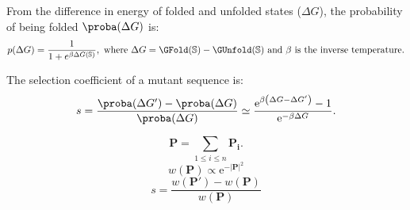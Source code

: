 \documentclass{article}
\newcommand{\e}{\mathrm{e}}
\begin{document}
From the difference in energy of folded and unfolded states ($\Delta G$), the probability of being folded $\proba (\Delta G)$ is:
\begin{equation*}
p(\Delta G) = \dfrac{1}{1 + e^{\beta \Delta G(\mathbb{S}) }}, \text{ where }
\Delta G = \GFold (\mathbb{S}) - \GUnfold (\mathbb{S}) \text{ and $\beta$ is the inverse temperature}.
\end{equation*}

The selection coefficient of a mutant sequence is:
\begin{equation*}
s  = \dfrac{\proba (\Delta G') - \proba (\Delta G)}{\proba (\Delta G)} \simeq \dfrac{ \e^{\beta \left( \Delta G - \Delta G' \right) } - 1}{ \e^{- \beta \Delta G }}.
\end{equation*}

\begin{center}
\end{center}
\begin{equation*}
\bm{P}  = \sum\limits_{1 \leq i \leq n} \bm{P_i}.
\end{equation*}
\begin{equation*}
w(\bm{P}) \propto \e^{ - \left| \bm{P} \right|^2 }
\end{equation*}
\begin{equation*}
s  = \dfrac{w(\bm{P'}) - w(\bm{P})}{w(\bm{P})}
\end{equation*}
\end{document}
